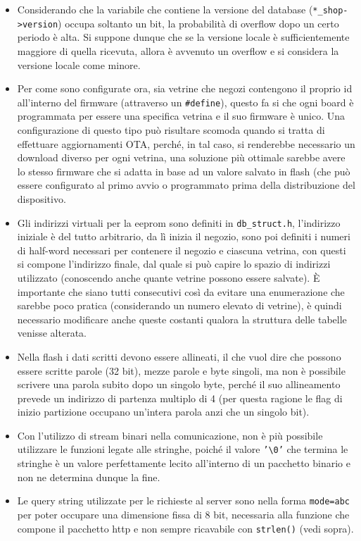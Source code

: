 \begin{itemize}
  \item Considerando che la variabile che contiene la versione del database (\texttt{*\_shop->version}) occupa soltanto un bit, la probabilit\`a di overflow dopo un certo periodo \`e alta. Si suppone dunque che se la versione locale \`e sufficientemente maggiore di quella ricevuta, allora \`e avvenuto un overflow e si considera la versione locale come minore.
  \item Per come sono configurate ora, sia vetrine che negozi contengono il proprio id all'interno del firmware (attraverso un \texttt{\#define}), questo fa si che ogni board \`e programmata per essere una specifica vetrina e il suo firmware \`e unico. Una configurazione di questo tipo pu\`o risultare scomoda quando si tratta di effettuare aggiornamenti OTA, perch\'e, in tal caso, si renderebbe necessario un download diverso per ogni vetrina, una soluzione pi\`u ottimale sarebbe avere lo stesso firmware che si adatta in base ad un valore salvato in flash (che pu\`o essere configurato al primo avvio o programmato prima della distribuzione del dispositivo.
  \item Gli indirizzi virtuali per la eeprom sono definiti in \texttt{db\_struct.h}, l'indirizzo iniziale \`e del tutto arbitrario, da l\`i inizia il negozio, sono poi definiti i numeri di half-word necessari per contenere il negozio e ciascuna vetrina, con questi si compone l'indirizzo finale, dal quale si pu\`o capire lo spazio di indirizzi utilizzato (conoscendo anche quante vetrine possono essere salvate). \`E importante che siano tutti consecutivi cos\`i da evitare una enumerazione che sarebbe poco pratica (considerando un numero elevato di vetrine), \`e quindi necessario modificare anche queste costanti qualora la struttura delle tabelle venisse alterata.
  \item Nella flash i dati scritti devono essere allineati, il che vuol dire che possono essere scritte parole (32 bit), mezze parole e byte singoli, ma non \`e possibile scrivere una parola subito dopo un singolo byte, perch\'e il suo allineamento prevede un indirizzo di partenza multiplo di 4 (per questa ragione le flag di inizio partizione occupano un'intera parola anzi che un singolo bit).
  \item Con l'utilizzo di stream binari nella comunicazione, non \`e pi\`u possibile utilizzare le funzioni legate alle stringhe, poich\'e il valore \texttt{'\textbackslash 0'} che termina le stringhe \`e un valore perfettamente lecito all'interno di un pacchetto binario e non ne determina dunque la fine.
  \item Le query string utilizzate per le richieste al server sono nella forma \texttt{mode=abc} per poter occupare una dimensione fissa di 8 bit, necessaria alla funzione che compone il pacchetto http e non sempre ricavabile con \texttt{strlen()} (vedi sopra).

\end{itemize}

